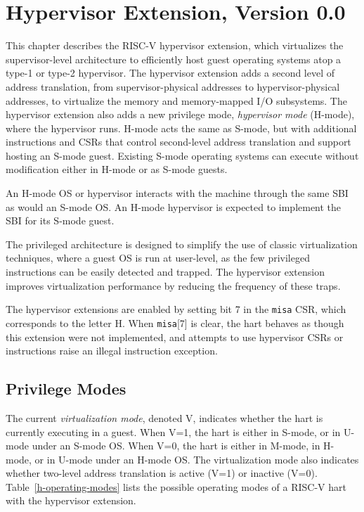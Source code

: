 \chapter{Hypervisor Extension, Version 0.0}
\label{hypervisor}

This chapter describes the RISC-V hypervisor extension, which virtualizes the
supervisor-level architecture to efficiently host guest operating systems atop
a type-1 or type-2 hypervisor.  The hypervisor extension adds a second level
of address translation, from supervisor-physical addresses to
hypervisor-physical addresses, to virtualize the memory and memory-mapped I/O
subsystems.  The hypervisor extension also adds a new privilege mode, {\em
hypervisor mode} (H-mode), where the hypervisor runs.  H-mode acts the same as
S-mode, but with additional instructions and CSRs that control second-level
address translation and support hosting an S-mode guest.  Existing S-mode
operating systems can execute without modification either in H-mode or as
S-mode guests.

An H-mode OS or hypervisor interacts with the machine through the same SBI
as would an S-mode OS.  An H-mode hypervisor is expected to implement the
SBI for its S-mode guest.

\begin{commentary}
The privileged architecture is designed to simplify the use of classic
virtualization techniques, where a guest OS is run at user-level, as
the few privileged instructions can be easily detected and trapped.
The hypervisor extension improves virtualization performance by
reducing the frequency of these traps.
\end{commentary}

The hypervisor extensions are enabled by setting bit 7 in the {\tt misa} CSR,
which corresponds to the letter H.  When {\tt misa}[7] is clear, the hart
behaves as though this extension were not implemented, and attempts to use
hypervisor CSRs or instructions raise an illegal instruction exception.

\section{Privilege Modes}

The current {\em virtualization mode}, denoted V, indicates whether the hart
is currently executing in a guest.  When V=1, the hart is either in S-mode, or
in U-mode under an S-mode OS.  When V=0, the hart is either in M-mode, in
H-mode, or in U-mode under an H-mode OS.  The virtualization mode also
indicates whether two-level address translation is active (V=1) or inactive
(V=0).  Table~\ref{h-operating-modes} lists the possible operating modes of
a RISC-V hart with the hypervisor extension.

